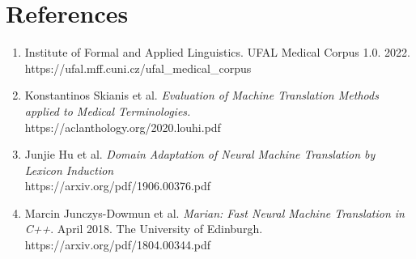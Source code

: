 \documentclass{article}
\begin{document}
\section{References}
\begin{enumerate}
    \item Institute of Formal and Applied Linguistics. UFAL Medical Corpus 1.0. 2022. \\ https://ufal.mff.cuni.cz/ufal\_medical\_corpus
    \item Konstantinos Skianis et al. \textit{Evaluation of Machine Translation Methods applied to Medical Terminologies.}\\ https://aclanthology.org/2020.louhi.pdf
    \item Junjie Hu et al. \textit{Domain Adaptation of Neural Machine Translation by Lexicon Induction} \\ https://arxiv.org/pdf/1906.00376.pdf
    \item Marcin Junczys-Dowmun et al. \textit{Marian: Fast Neural Machine Translation in C++}. April 2018. The University of Edinburgh. \\ https://arxiv.org/pdf/1804.00344.pdf


\end{enumerate}
\end{document}
